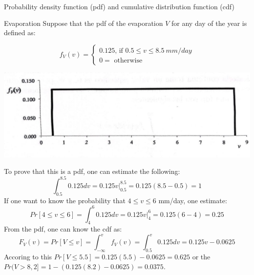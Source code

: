 \documentclass[8pt]{beamer}
\begin{document}
\begin{frame}{Probability density function (pdf) and cumulative distribution function (cdf)} 
    
    \begin{exampleblock}{Evaporation}
        Suppose that the pdf of the evaporation $V$ for any day of the year is defined as:
        \begin{minipage}{0.49\textwidth}
\[
f_V (v) = 
\left\{
\begin{array}{l}
    0.125 \text{, if } 0.5\leq v \leq 8.5 \ mm/day  \\
    0 = \text{ otherwise} 
\end{array}
\right.
\]
        \end{minipage}
        \hfill
        \begin{minipage}{0.39\textwidth}
            \includegraphics[width=\linewidth]{fiM18.jpeg}
        \end{minipage}
       To prove that this is a pdf, one can estimate the following:
       \[
           \int_{0.5}^{8.5} 0.125 dv = 0.125v \Big|_{0.5}^{8.5} = 0.125(8.5-0.5) = 1
       \]
       If one  want to know the probability that $4 \leq v \leq 6$ mm/day, one estimate:
       \[
           Pr[4 \leq v \leq 6] =  \int_{4}^{6} 0.125 dv = 0.125v \Big|_{4}^{6} = 0.125(6-4) = 0.25
       \]
       From the pdf, one can know the cdf as:
\[
    F_V (v) = Pr [V \leq v] = \int_{-\infty}^{v} f_V (v) = \int_{0.5}^{v} 0.125 dv = 0.125v - 0.0625 
       \]
       Accoring to this $Pr[V \leq 5.5] = 0.125(5.5) - 0.0625 = 0.625$ or the $Pr(V > 8,2] = 1 - (0.125(8.2) - 0.0625) = 0.0375$.
    \end{exampleblock}    
\end{frame}
\end{document}

